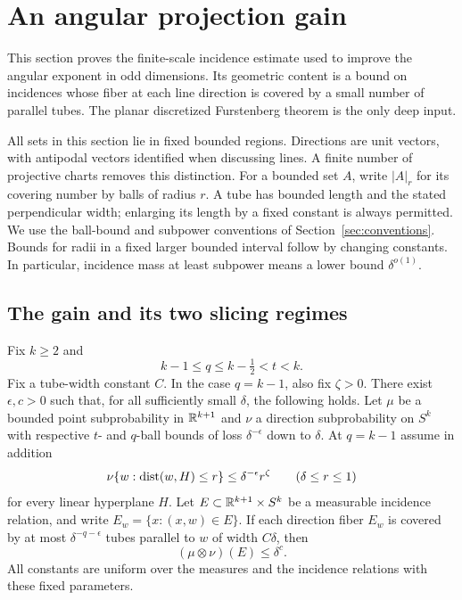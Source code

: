 \section{An angular projection gain}\label{ang:section}

This section proves the finite-scale incidence estimate used to improve
the angular exponent in odd dimensions. Its geometric content is a bound
on incidences whose fiber at each line direction is covered by a small
number of parallel tubes. The planar discretized Furstenberg theorem is
the only deep input.

All sets in this section lie in fixed bounded regions. Directions are unit
vectors, with antipodal vectors identified when discussing lines. A finite
number of projective charts removes this distinction. For a bounded set
$A$, write $|A|_r$ for its covering number by balls of radius $r$. A tube has
bounded length and the stated perpendicular width; enlarging its length by
a fixed constant is always permitted. We use the ball-bound and subpower
conventions of Section~\ref{sec:conventions}. Bounds for radii in a fixed
larger bounded interval follow by changing constants. In particular,
incidence mass at least subpower means a lower bound $\delta^{o(1)}$.

\subsection{The gain and its two slicing regimes}

\begin{theorem}\label{ang:linear-gain}
Fix $k\ge2$ and
\[
 k-1\le q\le k-\tfrac12<t<k.
\]
Fix a tube-width constant $C$. In the case $q=k-1$, also fix
$\zeta>0$. There exist $\epsilon,c>0$ such that, for all sufficiently
small $\delta$, the following holds. Let $\mu$ be a bounded point
subprobability in $\mathbb R^{k+1}$ and $\nu$ a direction subprobability on $S^k$
with respective $t$- and $q$-ball bounds of loss $\delta^{-\epsilon}$
down to $\delta$. At $q=k-1$ assume in addition
\begin{equation}\label{ang:endpoint-plate}
 \nu\{w:\operatorname{dist}(w,H)\le r\}\le\delta^{-\epsilon}r^\zeta
       \qquad(\delta\le r\le1)
\end{equation}
for every linear hyperplane $H$. Let $E\subset\mathbb R^{k+1}\times S^k$ be a
measurable incidence relation, and write $E_w=\{x:(x,w)\in E\}$.
If each direction fiber $E_w$ is covered by at most
$\delta^{-q-\epsilon}$ tubes parallel to $w$ of width $C\delta$, then
\[
 (\mu\otimes\nu)(E)\le\delta^c.
\]
All constants are uniform over the measures and the incidence relations
with these fixed parameters.
\end{theorem}

